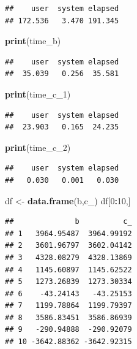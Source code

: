 \documentclass[]{article}
\newenvironment{Shaded}{\begin{snugshade}}{\end{snugshade}}
\newcommand{\DecValTok}[1]{\textcolor[rgb]{0.00,0.00,0.81}{#1}}
\newcommand{\KeywordTok}[1]{\textcolor[rgb]{0.13,0.29,0.53}{\textbf{#1}}}
\newcommand{\NormalTok}[1]{#1}
\newcommand{\OperatorTok}[1]{\textcolor[rgb]{0.81,0.36,0.00}{\textbf{#1}}}
\newcommand{\StringTok}[1]{\textcolor[rgb]{0.31,0.60,0.02}{#1}}
\begin{document}
\begin{verbatim}
##    user  system elapsed 
## 172.536   3.470 191.345
\end{verbatim}

\begin{Shaded}
\begin{Highlighting}[]
\KeywordTok{print}\NormalTok{(time_b)}
\end{Highlighting}
\end{Shaded}

\begin{verbatim}
##    user  system elapsed 
##  35.039   0.256  35.581
\end{verbatim}

\begin{Shaded}
\begin{Highlighting}[]
\KeywordTok{print}\NormalTok{(time_c_}\DecValTok{1}\NormalTok{)}
\end{Highlighting}
\end{Shaded}

\begin{verbatim}
##    user  system elapsed 
##  23.903   0.165  24.235
\end{verbatim}

\begin{Shaded}
\begin{Highlighting}[]
\KeywordTok{print}\NormalTok{(time_c_}\DecValTok{2}\NormalTok{)}
\end{Highlighting}
\end{Shaded}

\begin{verbatim}
##    user  system elapsed 
##   0.030   0.001   0.030
\end{verbatim}

\begin{Shaded}
\begin{Highlighting}[]
\NormalTok{df <-}\StringTok{ }\KeywordTok{data.frame}\NormalTok{(b,c_)}
\NormalTok{df[}\DecValTok{0}\OperatorTok{:}\DecValTok{10}\NormalTok{,]}
\end{Highlighting}
\end{Shaded}

\begin{verbatim}
##              b          c_
## 1   3964.95487  3964.99192
## 2   3601.96797  3602.04142
## 3   4328.08279  4328.13869
## 4   1145.60897  1145.62522
## 5   1273.26839  1273.30334
## 6    -43.24143   -43.25153
## 7   1199.78864  1199.79397
## 8   3586.83451  3586.86939
## 9   -290.94888  -290.92079
## 10 -3642.88362 -3642.92315
\end{verbatim}
\end{document}
